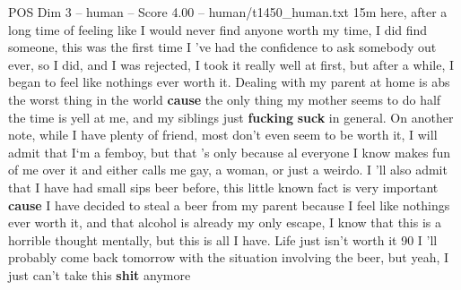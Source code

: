 \begin{textsample}{POS Dim 3 – human – Score 4.00 – human/t1450\_human.txt}  \label{ex:f3_pos_003}
15m here, after a long time of feeling like I would never find anyone worth my time, I did find someone, this was the first time I ’ve had the confidence to ask somebody out ever, so I did, and I was rejected, I took it really well at first, but after a while, I began to feel like nothings ever worth it.
Dealing with my parent at home is abs the worst thing in the world \textbf{cause} the only thing my mother seems to do half the time is yell at me, and my siblings just \textbf{fucking} \textbf{suck} in general.
On another note, while I have plenty of friend, most don't even seem to be worth it, I will admit that I‘m a femboy, but that ’s only because al everyone I know makes fun of me over it and either calls me gay, a woman, or just a weirdo.
I ’ll also admit that I have had small sips beer before, this little known fact is very important \textbf{cause} I have decided to steal a beer from my parent because I feel like nothings ever worth it, and that alcohol is already my only escape, I know that this is a horrible thought mentally, but this is all I have.
Life just isn't worth it 90 %
I ’ll probably come back tomorrow with the situation involving the beer, but yeah, I just can't take this \textbf{shit} anymore

\end{textsample}
